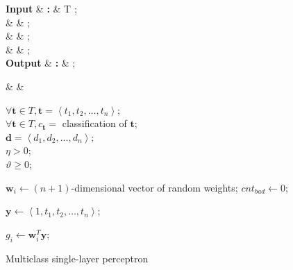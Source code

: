 \documentclass[twoside]{IEEEtran}
\begin{document}
\begin{figure}[!t]
    \centering
    \setlength{\intextsep}{0pt}

    \begin{algorithm}[H]
        \caption{Multiclass single-layer perceptron}

        \begin{flalign*}
            \setlength{\arraycolsep}{0pt}
            \begin{matrix*}[l]
                \textbf{Input}  & \textbf{: } & T ;          \\
                \text{}         &           &  ;           \\
                \text{}         &           & \eta {};                   \\
                \text{}         &           & \vartheta {}; \\
                \textbf{Output} & \textbf{: } &  ;
            \end{matrix*} &  &
        \end{flalign*}
        \begin{algorithmic}
            \Require%
            \( \forall \mathbf{t} \in T, \mathbf{t} = \left<t_1, t_2, \dots, t_n\right> \); \\
            \( \forall \mathbf{t} \in T, c_\mathbf{t} = \) classification of \( \mathbf{t} \); \\
            \( \mathbf{d} = \left<d_1, d_2, \dots, d_n\right>; \) \\
            \( \eta > 0 \); \\
            \( \vartheta \geq 0 \);

            \State{}

                \State%
                \( \mathbf{w}_i \gets \left(n + 1\right) \)-dimensional vector of random weights;
            \EndFor%
                \State%
                \( cnt_{bad} \gets 0 \);

                    \State%
                    \( \mathbf{y} \gets \left<1, t_1, t_2, \dots, t_n\right> \);

                        \State%
                        \( g_i \gets \mathbf{w}_i^T \mathbf{y} \);
                    \EndFor%


\end{algorithmic}
\end{algorithm}
\end{figure}
\end{document}
